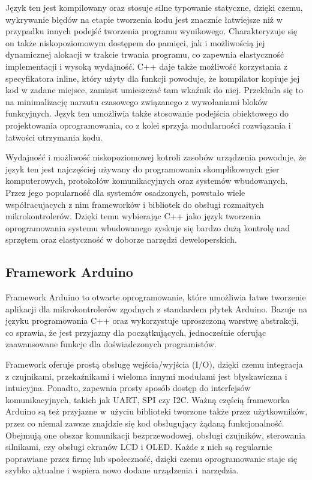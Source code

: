 \documentclass[12pt,twoside]{article}
\begin{document}
Język ten jest kompilowany oraz stosuje silne typowanie statyczne, dzięki czemu, wykrywanie błędów na etapie tworzenia kodu jest znacznie łatwiejsze niż w przypadku innych podejść tworzenia programu wynikowego. Charakteryzuje się on także niskopoziomowym dostępem do pamięci, jak i możliwością jej dynamicznej alokacji w trakcie trwania programu, co zapewnia elastyczność implementacji i wysoką wydajność. C++ daje także możliwość korzystania z specyfikatora inline, który użyty dla funkcji powoduje, że kompilator kopiuje jej kod w zadane miejsce, zamiast umieszczać tam wkaźnik do niej. Przekłada się to na minimalizację narzutu czasowego związanego z wywołaniami bloków funkcyjnych. Język ten umożliwia także stosowanie podejścia obiektowego do projektowania oprogramowania, co z kolei sprzyja modularności rozwiązania i łatwości utrzymania kodu\cite{cppBjarne}.

Wydajność i możliwość niskopoziomowej kotroli zasobów urządzenia powoduje, że język ten jest  najczęściej używany do programowania skomplikownych gier
komputerowych, protokołów komunikacyjnych oraz systemów wbudowanych. Przez jego popularność dla systemów osadzonych, powstało wiele współracujacych z nim frameworków i bibliotek do obsługi rozmaitych mikrokontrolerów. Dzięki temu wybierając C++ jako język tworzenia oprogramowania systemu wbudowanego zyskuje się bardzo dużą kontrolę nad sprzętem oraz elastyczność w doborze narzędzi deweloperskich.

\subsection{Framework Arduino}
Framework Arduino to otwarte oprogramowanie, które umożliwia łatwe tworzenie aplikacji dla mikrokontrolerów zgodnych z standardem płytek Arduino. Bazuje na języku programowania C++ oraz wykorzystuje uproszczoną warstwę abstrakcji, co sprawia, że jest przyjazny dla początkujących, jednocześnie oferując zaawansowane funkcje dla doświadczonych programistów\cite{arduinoIntroduction}.

Framework oferuje prostą obsługę wejścia/wyjścia (I/O), dzięki czemu integracja z czujnikami, przekaźnikami i wieloma innymi modułami jest błyskawiczna i intuicyjna. Ponadto, zapewnia prosty sposób dostęp do interfejsów komunikacyjnych,
takich jak UART, SPI czy I2C. Ważną częścią frameworka Arduino są też przyjazne w~użyciu biblioteki tworzone także przez użytkowników, przez co niemal zawsze znajdzie się kod obsługujący żądaną funkcjonalność. Obejmują one obszar komunikacji bezprzewodowej, obsługi czujników, sterowania silnikami, czy obsługi ekranów LCD i OLED. Każde z nich są regularnie poprawiane przez firmę lub społeczność, dzięki czemu oprogramowanie staje się szybko aktualne i wspiera nowo dodane urządzenia i~narzędzia.
\end{document}
